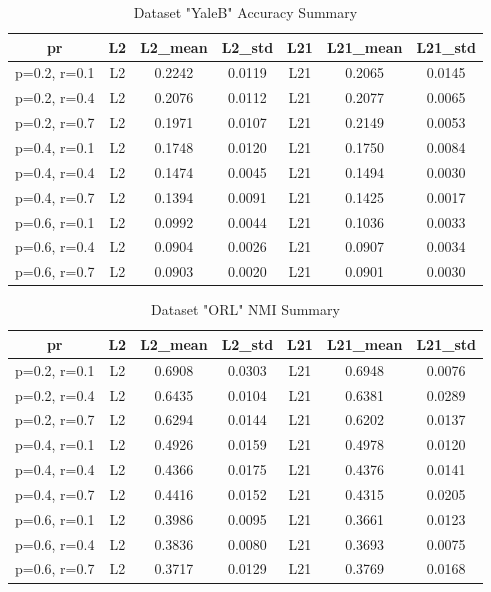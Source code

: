 \begin{table}[p]
\centering
\begin{tabular}{c c c c c c c}
\hline
\textbf{pr} & \textbf{L2} & \textbf{L2\_mean} & \textbf{L2\_std} & \textbf{L21} & \textbf{L21\_mean} & \textbf{L21\_std} \\
\hline
p=0.2, r=0.1 & L2 & 0.2242 & 0.0119 & L21 & 0.2065 & 0.0145 \\
p=0.2, r=0.4 & L2 & 0.2076 & 0.0112 & L21 & 0.2077 & 0.0065 \\
p=0.2, r=0.7 & L2 & 0.1971 & 0.0107 & L21 & 0.2149 & 0.0053 \\
p=0.4, r=0.1 & L2 & 0.1748 & 0.0120 & L21 & 0.1750 & 0.0084 \\
p=0.4, r=0.4 & L2 & 0.1474 & 0.0045 & L21 & 0.1494 & 0.0030 \\
p=0.4, r=0.7 & L2 & 0.1394 & 0.0091 & L21 & 0.1425 & 0.0017 \\
p=0.6, r=0.1 & L2 & 0.0992 & 0.0044 & L21 & 0.1036 & 0.0033 \\
p=0.6, r=0.4 & L2 & 0.0904 & 0.0026 & L21 & 0.0907 & 0.0034 \\
p=0.6, r=0.7 & L2 & 0.0903 & 0.0020 & L21 & 0.0901 & 0.0030 \\
\hline
\end{tabular}
\caption{Dataset "YaleB" Accuracy Summary}
\label{tab:yaleb_acc}
\end{table}

\begin{table}[p]
\centering
\begin{tabular}{c c c c c c c}
\hline
\textbf{pr} & \textbf{L2} & \textbf{L2\_mean} & \textbf{L2\_std} & \textbf{L21} & \textbf{L21\_mean} & \textbf{L21\_std} \\
\hline
p=0.2, r=0.1 & L2 & 0.6908 & 0.0303 & L21 & 0.6948 & 0.0076 \\
p=0.2, r=0.4 & L2 & 0.6435 & 0.0104 & L21 & 0.6381 & 0.0289 \\
p=0.2, r=0.7 & L2 & 0.6294 & 0.0144 & L21 & 0.6202 & 0.0137 \\
p=0.4, r=0.1 & L2 & 0.4926 & 0.0159 & L21 & 0.4978 & 0.0120 \\
p=0.4, r=0.4 & L2 & 0.4366 & 0.0175 & L21 & 0.4376 & 0.0141 \\
p=0.4, r=0.7 & L2 & 0.4416 & 0.0152 & L21 & 0.4315 & 0.0205 \\
p=0.6, r=0.1 & L2 & 0.3986 & 0.0095 & L21 & 0.3661 & 0.0123 \\
p=0.6, r=0.4 & L2 & 0.3836 & 0.0080 & L21 & 0.3693 & 0.0075 \\
p=0.6, r=0.7 & L2 & 0.3717 & 0.0129 & L21 & 0.3769 & 0.0168 \\
\hline
\end{tabular}
\caption{Dataset "ORL" NMI Summary}
\label{tab:orl_nmi}
\end{table}

